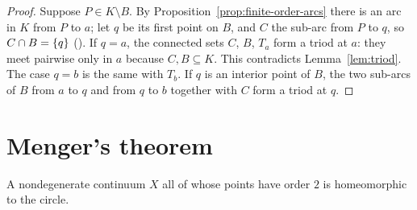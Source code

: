 \begin{proof}
Suppose $P\in K\setminus B$. By Proposition~\ref{prop:finite-order-arcs} there is an arc in $K$ from $P$ to $a$; let $q$ be its first point
on $B$, and $C$ the sub-arc from $P$ to $q$, so $C\cap B=\left\{ q \right\}$ (). If $q=a$, the connected sets $C$, $B$, $T_a$ form a
triod at $a$: they meet pairwise only in $a$ because $C,B\subseteq K$. This contradicts Lemma~\ref{lem:triod}. The case $q=b$ is the same with
$T_b$. If $q$ is an interior point of $B$, the two sub-arcs of $B$ from $a$ to $q$ and from $q$ to $b$ together with $C$ form a triod at $q$.
\end{proof}


\section{Menger's theorem}

\begin{theorem}[Menger]\label{thm:menger}
A nondegenerate continuum $X$ all of whose points have order $2$ is homeomorphic to the circle.
\end{theorem}

